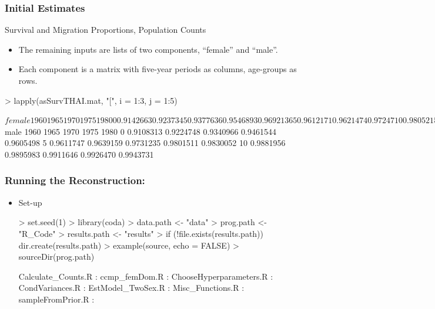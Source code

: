 \documentclass[smaller,compress,table]{beamer}
\begin{document}
\begin{frame}[fragile]
  \frametitle{Initial Estimates}
  \begin{block}{Survival and Migration Proportions, Population Counts}
  \begin{itemize}
      \item The remaining inputs are lists of two components, ``female'' and ``male''.
      \item Each component is a matrix with five-year periods as columns, age-groups as rows.
  \end{itemize}

\begin{Schunk}
\begin{Sinput}
> lapply(asSurvTHAI.mat, "[", i = 1:3, j = 1:5)
\end{Sinput}
\begin{Soutput}
$female
        1960      1965      1970      1975      1980
0  0.9142663 0.9237345 0.9377636 0.9546893 0.9692136
5  0.9612171 0.9621474 0.9724710 0.9805215 0.9857410
10 0.9899652 0.9911082 0.9923885 0.9936778 0.9954615

$male
        1960      1965      1970      1975      1980
0  0.9108313 0.9224748 0.9340966 0.9461544 0.9605498
5  0.9611747 0.9639159 0.9731235 0.9801511 0.9830052
10 0.9881956 0.9895983 0.9911646 0.9926470 0.9943731
\end{Soutput}
\end{Schunk}

\end{block}
\end{frame}


\begin{frame}[fragile]
  \frametitle{Running the Reconstruction: }
  \begin{itemize}
      \item Set-up

\begin{Schunk}
\begin{Sinput}
> set.seed(1)
> library(coda)
> data.path <- "data"
> prog.path <- "R_Code"
> results.path <- "results"
> if (!file.exists(results.path)) dir.create(results.path)
> example(source, echo = FALSE)
> sourceDir(prog.path)
\end{Sinput}
\begin{Soutput}
Calculate_Counts.R :
ccmp_femDom.R :
ChooseHyperparameters.R :
CondVariances.R :
EstModel_TwoSex.R :
Misc_Functions.R :
sampleFromPrior.R :
\end{Soutput}
\end{Schunk}


\end{itemize}
\end{frame}
\end{document}
